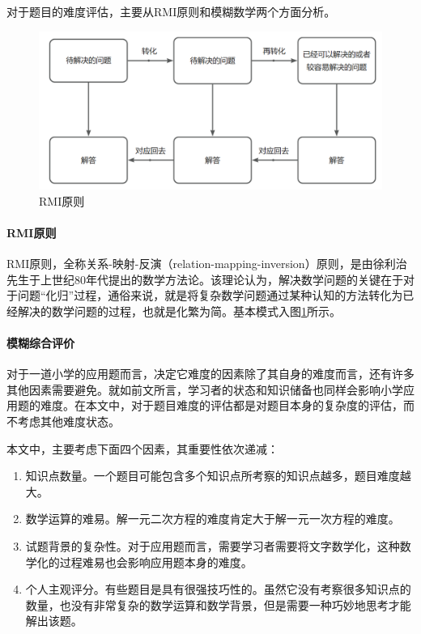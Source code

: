 对于题目的难度评估，主要从RMI原则和模糊数学两个方面分析。

\begin{figure}[h]
    \centering
    \includegraphics[scale=0.3]{res/figure040117.png}
    \caption{RMI原则}
    \label{figure040117}
\end{figure}

\paragraph{RMI原则}

RMI原则，全称关系-映射-反演（relation-mapping-inversion）原则，是由徐利治先生于上世纪80年代提出的数学方法论\cite{zhangShuxueshitishiqiannandudeyingxiangyinsujiqilianghuayanjiu2022}。该理论认为，解决数学问题的关键在于对于问题“化归”过程，通俗来说，就是将复杂数学问题通过某种认知的方法转化为已经解决的数学问题的过程，也就是化繁为简。基本模式入图\ref{figure040117}所示。

\paragraph{模糊综合评价}

对于一道小学的应用题而言，决定它难度的因素除了其自身的难度而言，还有许多其他因素需要避免。就如前文所言，学习者的状态和知识储备也同样会影响小学应用题的难度。在本文中，对于题目难度的评估都是对题目本身的复杂度的评估，而不考虑其他难度状态。

本文中，主要考虑下面四个因素，其重要性依次递减：

\begin{enumerate}
    \item 知识点数量。一个题目可能包含多个知识点所考察的知识点越多，题目难度越大。
    \item 数学运算的难易。解一元二次方程的难度肯定大于解一元一次方程的难度。
    \item 试题背景的复杂性。对于应用题而言，需要学习者需要将文字数学化，这种数学化的过程难易也会影响应用题本身的难度。
    \item 个人主观评分。有些题目是具有很强技巧性的。虽然它没有考察很多知识点的数量，也没有非常复杂的数学运算和数学背景，但是需要一种巧妙地思考才能解出该题。
\end{enumerate}

